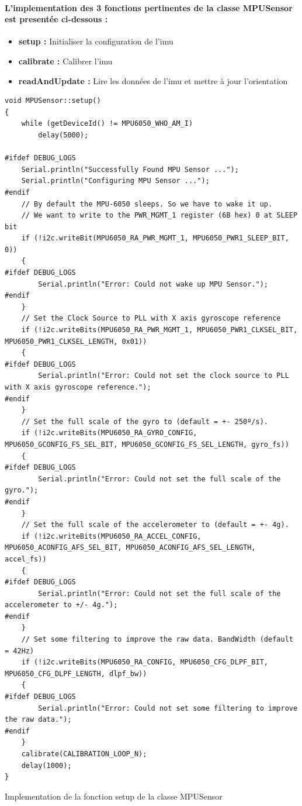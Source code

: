 \paragraph{L'implementation des 3 fonctions pertinentes de la classe MPUSensor est presentée ci-dessous :}
\begin{itemize}
	\item \textbf{setup :} Initialiser la configuration de l'\gls{imu}
	\item \textbf{calibrate :} Calibrer l'\gls{imu}
	\item \textbf{readAndUpdate :} Lire les données de l'\gls{imu} et mettre à jour l'orientation
\end{itemize}
\begin{listing}[!htpb]
	\begin{verbatim}
void MPUSensor::setup()
{
	while (getDeviceId() != MPU6050_WHO_AM_I)
		delay(5000);

#ifdef DEBUG_LOGS
	Serial.println("Successfully Found MPU Sensor ...");
	Serial.println("Configuring MPU Sensor ...");
#endif
	// By default the MPU-6050 sleeps. So we have to wake it up.
	// We want to write to the PWR_MGMT_1 register (6B hex) 0 at SLEEP bit
	if (!i2c.writeBit(MPU6050_RA_PWR_MGMT_1, MPU6050_PWR1_SLEEP_BIT, 0))
	{
#ifdef DEBUG_LOGS
		Serial.println("Error: Could not wake up MPU Sensor.");
#endif
	}
	// Set the Clock Source to PLL with X axis gyroscope reference
	if (!i2c.writeBits(MPU6050_RA_PWR_MGMT_1, MPU6050_PWR1_CLKSEL_BIT, MPU6050_PWR1_CLKSEL_LENGTH, 0x01))
	{
#ifdef DEBUG_LOGS
		Serial.println("Error: Could not set the clock source to PLL with X axis gyroscope reference.");
#endif
	}
	// Set the full scale of the gyro to (default = +- 250º/s).
	if (!i2c.writeBits(MPU6050_RA_GYRO_CONFIG, MPU6050_GCONFIG_FS_SEL_BIT, MPU6050_GCONFIG_FS_SEL_LENGTH, gyro_fs))
	{
#ifdef DEBUG_LOGS
		Serial.println("Error: Could not set the full scale of the gyro.");
#endif
	}
	// Set the full scale of the accelerometer to (default = +- 4g).
	if (!i2c.writeBits(MPU6050_RA_ACCEL_CONFIG, MPU6050_ACONFIG_AFS_SEL_BIT, MPU6050_ACONFIG_AFS_SEL_LENGTH, accel_fs))
	{
#ifdef DEBUG_LOGS
		Serial.println("Error: Could not set the full scale of the accelerometer to +/- 4g.");
#endif
	}
	// Set some filtering to improve the raw data. BandWidth (default = 42Hz)
	if (!i2c.writeBits(MPU6050_RA_CONFIG, MPU6050_CFG_DLPF_BIT, MPU6050_CFG_DLPF_LENGTH, dlpf_bw))
	{
#ifdef DEBUG_LOGS
		Serial.println("Error: Could not set some filtering to improve the raw data.");
#endif
	}
	calibrate(CALIBRATION_LOOP_N);
	delay(1000);
}
	\end{verbatim}
	\caption{Implementation de la fonction setup de la classe MPUSensor}
	\label{listing:mpu-setup}
\end{listing}

